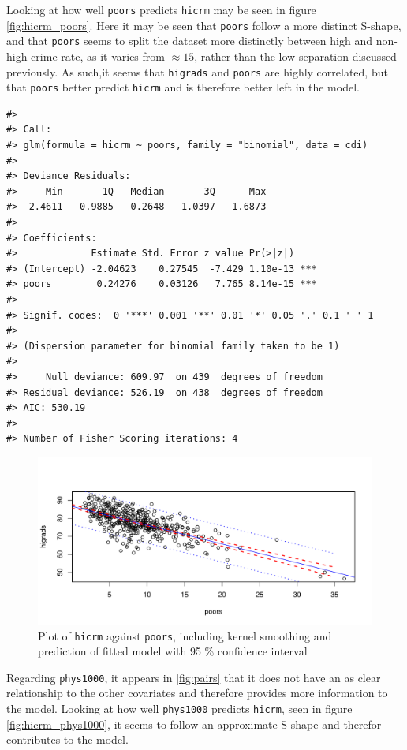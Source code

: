 \documentclass[a4paper]{article}
\begin{document}
Looking at how well \texttt{poors} predicts \texttt{hicrm} may be seen
in figure \ref{fig:hicrm_poors}. Here it may be seen that \texttt{poors}
follow a more distinct S-shape, and that \texttt{poors} seems to split
the dataset more distinctly between high and non-high crime rate, as it
varies from \(\approx 15%
\), rather than the low separation discussed previously. As such,it
seems that \texttt{higrads} and \texttt{poors} are highly correlated,
but that \texttt{poors} better predict \texttt{hicrm} and is therefore
better left in the model.

\begin{verbatim}
#> 
#> Call:
#> glm(formula = hicrm ~ poors, family = "binomial", data = cdi)
#> 
#> Deviance Residuals: 
#>     Min       1Q   Median       3Q      Max  
#> -2.4611  -0.9885  -0.2648   1.0397   1.6873  
#> 
#> Coefficients:
#>             Estimate Std. Error z value Pr(>|z|)    
#> (Intercept) -2.04623    0.27545  -7.429 1.10e-13 ***
#> poors        0.24276    0.03126   7.765 8.14e-15 ***
#> ---
#> Signif. codes:  0 '***' 0.001 '**' 0.01 '*' 0.05 '.' 0.1 ' ' 1
#> 
#> (Dispersion parameter for binomial family taken to be 1)
#> 
#>     Null deviance: 609.97  on 439  degrees of freedom
#> Residual deviance: 526.19  on 438  degrees of freedom
#> AIC: 530.19
#> 
#> Number of Fisher Scoring iterations: 4
\end{verbatim}

\begin{figure}[h]
\includegraphics{Project_2_files/figure-latex/unnamed-chunk-29-1} \caption{\label{fig:hicrm_poors}Plot of \texttt{hicrm} against \texttt{poors}, including kernel smoothing and prediction of fitted model with 95 \% confidence interval}\label{fig:unnamed-chunk-29}
\end{figure}

Regarding \texttt{phys1000}, it appears in \ref{fig:pairs} that it does
not have an as clear relationship to the other covariates and therefore
provides more information to the model. Looking at how well
\texttt{phys1000} predicts \texttt{hicrm}, seen in figure
\ref{fig:hicrm_phys1000}, it seems to follow an approximate S-shape and
therefor contributes to the model.
\end{document}
